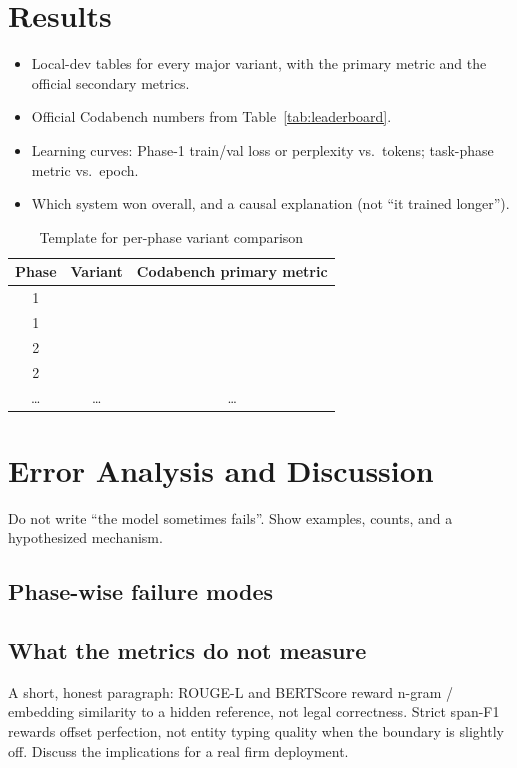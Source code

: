 \documentclass[11pt, oneside]{article}
\begin{document}
\section{Results}
\begin{itemize}[leftmargin=*]
    \item Local-dev tables for every major variant, with the primary metric and the official secondary metrics.
    \item Official Codabench numbers from Table~\ref{tab:leaderboard}.
    \item Learning curves: Phase-1 train/val loss or perplexity vs.\ tokens; task-phase metric vs.\ epoch.
    \item Which system won overall, and a causal explanation (not ``it trained longer'').
\end{itemize}
\begin{table}[H]
\centering
\caption{Template for per-phase variant comparison}
\label{tab:variants}
\begin{tabular}{ccc}
\toprule
Phase & Variant & Codabench primary metric \\
\midrule
1 &   &  \\
1 &   &  \\
2  &  &  \\
2  &  &  \\
\ldots & \ldots  & \ldots  \\
\bottomrule
\end{tabular}
\end{table}
\section{Error Analysis and Discussion}
Do not write ``the model sometimes fails''. Show examples, counts, and a hypothesized mechanism.
\subsection{Phase-wise failure modes}

\subsection{What the metrics do not measure}
A short, honest paragraph: ROUGE-L and BERTScore reward n-gram / embedding similarity to a hidden reference, not legal correctness. Strict span-F1 rewards offset perfection, not entity typing quality when the boundary is slightly off. Discuss the implications for a real firm deployment.
\end{document}
